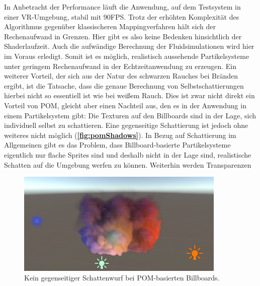 In Anbetracht der Performance läuft die Anwendung, auf dem Testsystem in einer VR-Umgebung, stabil mit 90FPS. Trotz der erhöhten Komplexität des Algorithmus gegenüber klassischeren 
Mappingverfahren hält sich der Rechenaufwand in Grenzen. Hier gibt es also keine Bedenken hinsichtlich der Shaderlaufzeit. Auch die aufwändige Berechnung der Fluidsimulationen wird hier im Voraus erledigt. 
Somit ist es möglich, realistisch aussehende Partikelsysteme unter geringem Rechenaufwand in der Echtzeitanwendung zu erzeugen. Ein weiterer Vorteil, der sich aus der Natur des schwarzen 
Rauches bei Bränden ergibt, ist die Tatsache, dass die genaue Berechnung von Selbstschattierungen hierbei nicht so essentiell ist wie bei weißem Rauch. Dies ist zwar nicht direkt ein Vorteil von POM, 
gleicht aber einen Nachteil aus, den es in der Anwendung in einem Partikelsystem gibt: Die Texturen auf den Billboards sind in der Lage, sich individuell selbst zu schattieren. 
Eine gegenseitige Schattierung ist jedoch ohne weiteres nicht möglich (\textbf{\autoref{fig:pomShadows}}). 
In Bezug auf Schattierung im Allgemeinen gibt es das Problem, dass Billboard-basierte Partikelsysteme eigentlich nur flache Sprites sind und deshalb nicht in der 
Lage sind, realistische Schatten auf die Umgebung werfen zu können. Weiterhin werden Transparenzen 



\begin{figure}[h!]
	\centering
	\includegraphics[width=0.89\textwidth]{Grafiken/Evaluation/pomShadows.png}
	\begin{footnotesize}
		\caption{Kein gegenseitiger Schattenwurf bei POM-basierten Billboards. }
		\label{fig:pomShadows}
	\end{footnotesize}
\end{figure}

